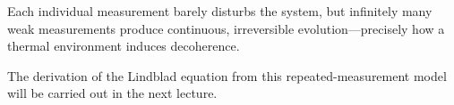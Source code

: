 \begin{intuition}
  Each individual measurement barely disturbs the system, but
  infinitely many weak measurements produce continuous, irreversible
  evolution---precisely how a thermal environment induces decoherence.
\end{intuition}

The derivation of the Lindblad equation from this
repeated-measurement model will be carried out in the next lecture.

